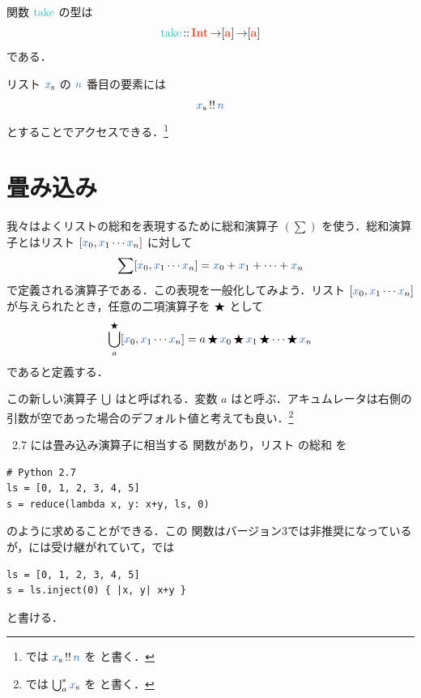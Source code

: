 \documentclass[a5paper,twoside,fleqn,draft]{jsbook}
\begin{document}
関数 $\mTake$ の型は
\begin{equation}
  \mTake
  \mIn\mIntType\mFuncArrow[\mA]\mFuncArrow[\mA]
\end{equation}
である．

\separator

リスト $\mList{x}$ の $\hVar{n}$ 番目の要素には
\begin{equation}
  \mList{x}\mListAt\hVar{n}
\end{equation}
とすることでアクセスできる．\footnote{\haskell では $\mList{x}\mListAt\hVar{n}$ を  と書く．}

\section{畳み込み}
\label{sec:convolution}

我々はよくリストの総和を表現するために総和演算子 $(\sum)$ を使う．総和演算子とはリスト $[\hVar{x}_0,\hVar{x}_1\dotsb\hVar{x}_n]$ に対して
\begin{equation}
  \sum[\hVar{x}_0,\hVar{x}_1\dotsb \hVar{x}_n]
  =\hVar{x}_0+\hVar{x}_1+\dotsb+\hVar{x}_n
\end{equation}
で定義される演算子である．この表現を一般化してみよう．リスト $[\hVar{x}_0,\hVar{x}_1\dotsb \hVar{x}_n]$ が与えられたとき，任意の二項演算子を $\operatorname{\bigstar}$ として
\begin{equation}
  \mFold^{\hAnyBinOp}_a[\hVar{x}_0,\hVar{x}_1\dotsb \hVar{x}_n]
  =a\hAnyBinOp \hVar{x}_0\hAnyBinOp \hVar{x}_1\hAnyBinOp\dotsb\hAnyBinOp \hVar{x}_n
\end{equation}
であると定義する．

この新しい演算子 $\operatorname*{\bigcup}$ はと呼ばれる．変数 $a$ はと呼ぶ．アキュムレータは右側の引数が空であった場合のデフォルト値と考えても良い．\footnote{\haskell では $\mFold^*_a\mList{x}$ を  と書く．}

\python\ 2.7 には畳み込み演算子に相当する  関数があり，リスト  の総和  を
\begin{pythoncode}
\begin{verbatim}
# Python 2.7
ls = [0, 1, 2, 3, 4, 5]
s = reduce(lambda x, y: x+y, ls, 0)
\end{verbatim}
\end{pythoncode}
のように求めることができる．この  関数は\python バージョン3では非推奨になっているが，\ruby には受け継がれていて，\ruby では
\begin{rubycode}
\begin{verbatim}
ls = [0, 1, 2, 3, 4, 5]
s = ls.inject(0) { |x, y| x+y }
\end{verbatim}
\end{rubycode}
と書ける．
\end{document}
